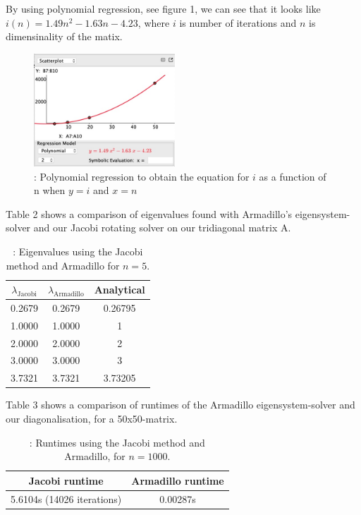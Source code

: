 \documentclass{article}
\begin{document}
	By using polynomial regression, see figure 1, we can see that it looks like
	$i(n) = 1.49n^2 - 1.63n - 4.23$, where $i$ is number of iterations
	and $n$ is dimensinality of the matix.\\

	\begin{figure}[hbt]
	\begin{center}
	    \includegraphics[width=200px]{bilde.jpg}
	    \caption{: Polynomial regression to obtain the equation for $i$ as a function of n when $y=i$ and $x=n$}
	    \label{fig:plot1b}
	\end{center}
	\end{figure}

	Table 2 shows a comparison of eigenvalues found with Armadillo's eigensystem-solver
	and our Jacobi rotating solver on our tridiagonal matrix A.
	\begin{table}[h!]
		\caption{: Eigenvalues using the Jacobi method and Armadillo for $n=5$.}
		\begin{tabular}{c c c}
			$\lambda_{\text{Jacobi}}$ & $\lambda_{\text{Armadillo}}$ & Analytical \\
			\hline
			0.2679 & 0.2679 & 0.26795 \\
			1.0000 & 1.0000 & 1 \\
			2.0000 & 2.0000 & 2 \\
			3.0000 & 3.0000 & 3 \\
			3.7321 & 3.7321 & 3.73205 \\
		\end{tabular}
	\end{table}

	Table 3 shows a comparison of runtimes of the Armadillo eigensystem-solver and our diagonalisation, for a 50x50-matrix.

	\begin{table}[h!]
		\caption{: Runtimes using the Jacobi method and Armadillo, for $n=1000$.}
		\begin{tabular}{c c}
			Jacobi runtime & Armadillo runtime\\
			\hline
			5.6104s (14026 iterations) & 0.00287s
		\end{tabular}
	\end{table}
\end{document}
